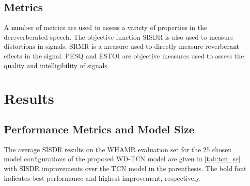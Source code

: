 \documentclass{article}
\begin{document}
\subsection{Metrics}
A number of metrics are used to assess a variety of properties in the dereverberated speech.
The objective function \ac{SISDR} is also used to measure distortions in signals.
\Ac{SRMR}  \cite{srmr} is a measure used to directly measure reverberant effects in the signal. 
\Ac{PESQ} \cite{PESQ} and \ac{ESTOI} \cite{estoi} are objective measures used to assess the quality and intelligibility of signals. 
\section{Results}
\label{sec:results}
\subsection{Performance Metrics and Model Size}
The average \ac{SISDR} results on the WHAMR evaluation set for the 25 chosen model configurations of the proposed \ac{WD-TCN} model are given in \autoref{tab:tcn_se} with \ac{SISDR} improvements over the \ac{TCN} model in the parenthesis. The bold font 
indicates best performance and highest improvement, respectively. 
\setlength{\tabcolsep}{3pt}
\begin{table}[!b]
\centering
{}
\caption{\ac{SISDR} performance of \Ac{WD-TCN} with \ac{SE} attention in dB. Numbers in $(\cdot)$ report performance improvement over baseline TCN.}
\label{tab:tcn_se}
\end{table}
\end{document}
